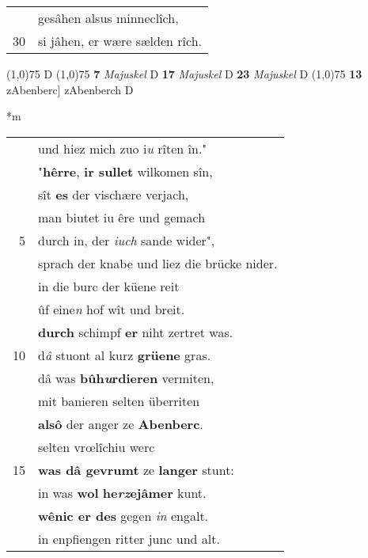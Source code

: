 \documentclass[8pt,a4paper,notitlepage]{article}
\begin{document}
\begin{table}[ht]
\begin{minipage}[t]{0.5\linewidth}
\begin{tabular}{rl}
 & gesâhen alsus minneclîch,\\ 
30 & si jâhen, er wære sælden rîch.\\ 
\end{tabular}
\scriptsize
\line(1,0){75} \newline
D \newline
\line(1,0){75} \newline
\textbf{7} \textit{Majuskel} D  \textbf{17} \textit{Majuskel} D  \textbf{23} \textit{Majuskel} D  \newline
\line(1,0){75} \newline
\textbf{13} zAbenberc] zAbenberch D \newline
\end{minipage}
\hspace{0.5cm}
\begin{minipage}[t]{0.5\linewidth}
\small
\begin{center}*m
\end{center}
\begin{tabular}{rl}
 & und hiez mich zuo i\textit{u} rîten în."\\ 
 & "\textbf{hêrre}, \textbf{ir sullet} wilkomen sîn,\\ 
 & sît \textbf{es} der vischære verjach,\\ 
 & man biutet iu êre und gemach\\ 
5 & durch in, der \textit{iuch} sande wider",\\ 
 & sprach der knabe und liez die brücke nider.\\ 
 & in die burc der küene reit\\ 
 & ûf eine\textit{n} hof wît und breit.\\ 
 & \textbf{durch} schimpf \textbf{er} niht zertret was.\\ 
10 & d\textit{â} stuont al kurz \textbf{grüene} gras.\\ 
 & dâ was \textbf{bûh\textit{u}rdieren} vermiten,\\ 
 & mit banieren selten überriten\\ 
 & \textbf{alsô} der anger ze \textbf{Abenberc}.\\ 
 & selten vrœlîchiu werc\\ 
15 & \textbf{was dâ gevrumt} ze \textbf{langer} stunt:\\ 
 & in was \textbf{wol} \textbf{he\textit{rz}ejâmer} kunt.\\ 
 & \textbf{wênic er des} gegen \textit{in} engalt.\\ 
 & in enpfiengen ritter junc und alt.\\ 

\end{tabular}
\end{minipage}
\end{table}
\end{document}
